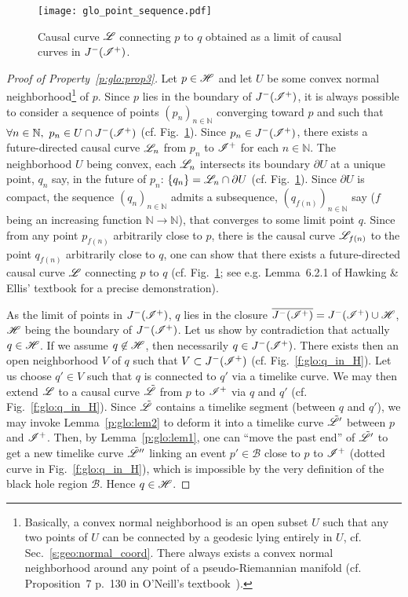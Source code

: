 \begin{figure}
\centerline{\texttt{[image: glo\_point\_sequence.pdf]}}
\caption[]{\label{f:glo:point_sequence} \footnotesize
Causal curve $\mathscr{L}$ connecting $p$ to $q$ obtained as a limit of causal curves
in $J^-(\mathscr{I}^+)$.}
\end{figure}

\begin{proof}[Proof of Property~\ref{p:glo:prop3}]
Let $p\in\mathscr{H}$ and let $U$ be some convex normal neighborhood\footnote{Basically,
a convex normal neighborhood is an open subset $U$ such that any two points of $U$
can be connected by a geodesic lying entirely in $U$, cf. Sec.~\ref{s:geo:normal_coord}.
There always exists a convex normal neighborhood around any point of a pseudo-Riemannian manifold
(cf. Proposition~7 p.~130 in O'Neill's textbook~\cite{ONeil83}).}
of $p$. Since $p$ lies in the boundary of $J^-(\mathscr{I}^+)$, it is always possible to
consider
a sequence of points $(p_n)_{n\in\mathbb{N}}$ converging toward $p$
and such that $\forall n\in\mathbb{N},\ p_n \in U \cap J^-(\mathscr{I}^+)$
(cf. Fig.~\ref{f:glo:point_sequence}).
Since $p_n\in J^-(\mathscr{I}^+)$,
there exists a future-directed causal curve $\mathscr{L}_{n}$ from $p_n$ to $\mathscr{I}^+$
for each $n\in\mathbb{N}$.
The neighborhood $U$ being convex, each $\mathscr{L}_n$ intersects its boundary $\partial U$
at a unique point, $q_n$ say, in the future of $p_n$: $\{q_n\}=\mathscr{L}_n \cap \partial U$
(cf. Fig.~\ref{f:glo:point_sequence}).
Since $\partial U$
is compact, the sequence $(q_n)_{n\in\mathbb{N}}$ admits a subsequence,
$(q_{f(n)})_{n\in\mathbb{N}}$ say ($f$ being an increasing
function $\mathbb{N}\rightarrow\mathbb{N}$),
that converges to some limit point $q$.
Since from any point $p_{f(n)}$ arbitrarily close to $p$, there is
the causal curve $\mathscr{L}_{f(n)}$ to the point $q_{f(n)}$ arbitrarily close to $q$,
one can show that
there exists a future-directed causal curve $\mathscr{L}$ connecting $p$ to $q$
(cf. Fig.~\ref{f:glo:point_sequence}; see e.g.
Lemma~6.2.1 of Hawking \& Ellis' textbook \cite{HawkiE73}
for a precise demonstration).

As the limit of points in $J^-(\mathscr{I}^+)$, $q$ lies in the closure
$\overline{J^-(\mathscr{I}^+)} = J^-(\mathscr{I}^+) \cup \mathscr{H}$, $\mathscr{H}$
being the boundary of $J^-(\mathscr{I}^+)$.
Let us show by contradiction that actually $q\in\mathscr{H}$.
If we assume $q\not\in\mathscr{H}$, then necessarily $q\in J^-(\mathscr{I}^+)$.
There exists then an open neighborhood $V$ of $q$ such that $V \subset  J^-(\mathscr{I}^+)$
(cf. Fig.~\ref{f:glo:q_in_H}).
Let us choose $q'\in V$ such that $q$ is connected to $q'$ via a timelike curve.
We may then extend $\mathscr{L}$ to a causal curve $\tilde{\mathscr{L}}$ from $p$ to $\mathscr{I}^+$
via $q$ and $q'$ (cf. Fig.~\ref{f:glo:q_in_H}). Since $\tilde{\mathscr{L}}$ contains a timelike segment
(between $q$ and $q'$), we may invoke Lemma~\ref{p:glo:lem2} to deform it into
a timelike curve $\tilde{\mathscr{L}}'$ between $p$ and $\mathscr{I}^+$. Then, by Lemma~\ref{p:glo:lem1},
one can ``move the past end'' of $\tilde{\mathscr{L}}'$
to get a new timelike curve $\tilde{\mathscr{L}}''$ linking an event $p'\in\mathscr{B}$ close
to $p$ to $\mathscr{I}^+$ (dotted curve in Fig.~\ref{f:glo:q_in_H}), which is impossible by the very definition of the black hole
region $\mathscr{B}$. Hence $q\in\mathscr{H}$.


\end{proof}

